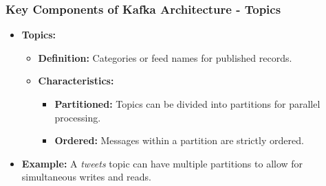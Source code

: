 \documentclass[aspectratio=169]{beamer}
\begin{document}
\begin{frame}
    \frametitle{Key Components of Kafka Architecture - Topics}
    \begin{itemize}
        \item \textbf{Topics:}
        \begin{itemize}
            \item \textbf{Definition:} Categories or feed names for published records.
            \item \textbf{Characteristics:}
            \begin{itemize}
                \item \textbf{Partitioned:} Topics can be divided into partitions for parallel processing.
                \item \textbf{Ordered:} Messages within a partition are strictly ordered.
            \end{itemize}
        \end{itemize}
        \item \textbf{Example:} A \emph{tweets} topic can have multiple partitions to allow for simultaneous writes and reads.
    \end{itemize}
\end{frame}
\end{document}
